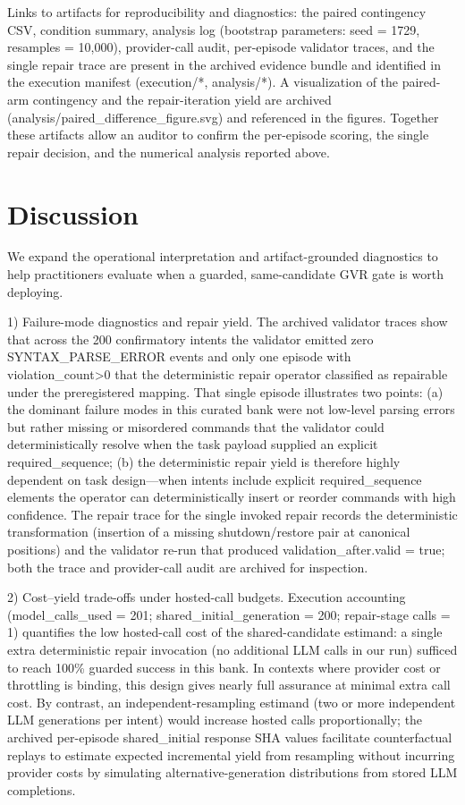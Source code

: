 \documentclass[conference]{IEEEtran}
\begin{document}
Links to artifacts for reproducibility and diagnostics: the paired contingency CSV, condition summary, analysis log (bootstrap parameters: seed = 1729, resamples = 10,000), provider-call audit, per-episode validator traces, and the single repair trace are present in the archived evidence bundle and identified in the execution manifest (execution/*, analysis/*). A visualization of the paired-arm contingency and the repair-iteration yield are archived (analysis/paired\_difference\_figure.svg) and referenced in the figures. Together these artifacts allow an auditor to confirm the per-episode scoring, the single repair decision, and the numerical analysis reported above.

\section{Discussion}
We expand the operational interpretation and artifact-grounded diagnostics to help practitioners evaluate when a guarded, same-candidate GVR gate is worth deploying.

1) Failure-mode diagnostics and repair yield. The archived validator traces show that across the 200 confirmatory intents the validator emitted zero SYNTAX\_PARSE\_ERROR events and only one episode with violation\_count>0 that the deterministic repair operator classified as repairable under the preregistered mapping. That single episode illustrates two points: (a) the dominant failure modes in this curated bank were not low-level parsing errors but rather missing or misordered commands that the validator could deterministically resolve when the task payload supplied an explicit required\_sequence; (b) the deterministic repair yield is therefore highly dependent on task design---when intents include explicit required\_sequence elements the operator can deterministically insert or reorder commands with high confidence. The repair trace for the single invoked repair records the deterministic transformation (insertion of a missing shutdown/restore pair at canonical positions) and the validator re-run that produced validation\_after.valid = true; both the trace and provider-call audit are archived for inspection.

2) Cost--yield trade-offs under hosted-call budgets. Execution accounting (model\_calls\_used = 201; shared\_initial\_generation = 200; repair-stage calls = 1) quantifies the low hosted-call cost of the shared-candidate estimand: a single extra deterministic repair invocation (no additional LLM calls in our run) sufficed to reach 100\% guarded success in this bank. In contexts where provider cost or throttling is binding, this design gives nearly full assurance at minimal extra call cost. By contrast, an independent-resampling estimand (two or more independent LLM generations per intent) would increase hosted calls proportionally; the archived per-episode shared\_initial response SHA values facilitate counterfactual replays to estimate expected incremental yield from resampling without incurring provider costs by simulating alternative-generation distributions from stored LLM completions.
\end{document}

